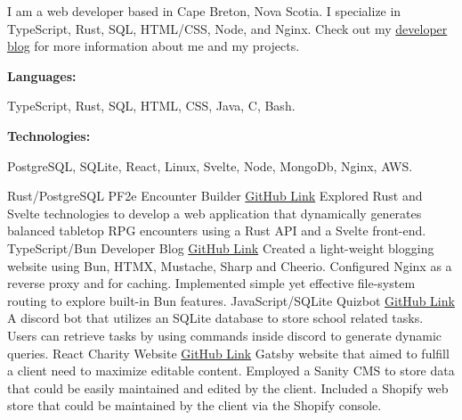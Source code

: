 \documentclass[9pt]{developercv} %
\begin{document}
\begin{minipage}[t]{0.46\textwidth}
I am a web developer based in Cape Breton,
Nova Scotia. I specialize in TypeScript, Rust, SQL, HTML/CSS,
Node, and Nginx. Check out my \textcolor{blue}{\href{https://chris-hughes.dev/}{developer blog}} for more information about me and my projects.
\end{minipage}
\hfill %
\begin{minipage}[t]{0.465\textwidth}
    \vspace{-6pt}
    \begin{minipage}[t]{0.2\textwidth}
        \textbf{Languages:}
    \end{minipage}
    \hfill
    \begin{minipage}[t]{0.73\textwidth}
        TypeScript, Rust, SQL, HTML, CSS, Java, C, Bash.
    \end{minipage}
    \vspace{4mm}
    
    \begin{minipage}[t]{0.2\textwidth}
        \textbf{Technologies:}
    \end{minipage}
    \hfill
    \begin{minipage}[t]{0.73\textwidth}
PostgreSQL, SQLite, React, Linux, Svelte, Node, MongoDb, Nginx, AWS.
    \end{minipage}
    
\end{minipage}

\begin{entrylist}
    \entry
		{Rust/PostgreSQL}
		{PF2e Encounter Builder}
		{\textcolor{blue}{\href{https://github.com/naokotani/encounter-builder}{GitHub Link}}}
    {Explored Rust and Svelte technologies to develop a web application that dynamically generates balanced
tabletop RPG encounters using a Rust API and a Svelte front-end.}
    \entry
		{TypeScript/Bun}
		{Developer Blog}
		{\textcolor{blue}{\href{https://github.com/naokotani/bun-blog}{GitHub Link}}}
		{Created a light-weight blogging website using Bun, HTMX, Mustache, Sharp and Cheerio. Configured
Nginx as a reverse proxy and for caching. Implemented simple yet effective file-system routing to explore
built-in Bun features.}
	\entry
		{JavaScript/SQLite}
		{Quizbot}
		{\textcolor{blue}{\href{https://github.com/naokotani/quizbot}{GitHub Link}}}
		{A discord bot that utilizes an SQLite database to store school related tasks. Users can retrieve tasks by using commands inside discord to generate dynamic queries.}
    \entry
		{React}
		{Charity Website}
		{\textcolor{blue}{\href{https://github.com/naokotani/ark-webstore}{GitHub Link}}}
		{Gatsby website that aimed to fulfill a client need to maximize editable content. Employed a Sanity CMS
to store data that could be easily maintained and edited by the client. Included a Shopify web store that
could be maintained by the client via the Shopify console.}
\end{entrylist}
\end{document}
